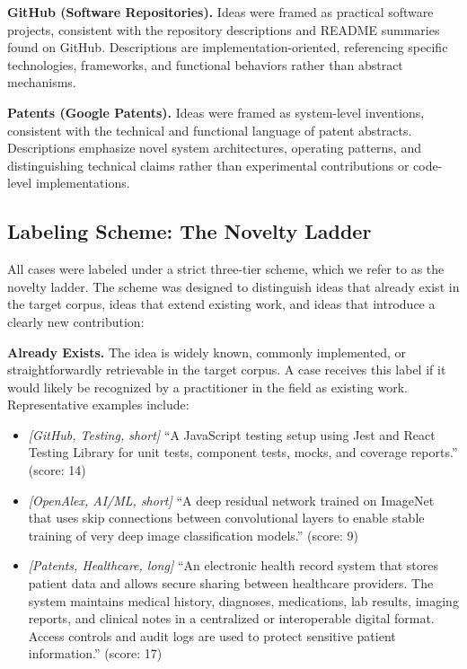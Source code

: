 \textbf{GitHub (Software Repositories).} Ideas were framed as practical software projects, consistent with the repository descriptions and README summaries found on GitHub. Descriptions are implementation-oriented, referencing specific technologies, frameworks, and functional behaviors rather than abstract mechanisms.
 
\textbf{Patents (Google Patents).} Ideas were framed as system-level inventions, consistent with the technical and functional language of patent abstracts. Descriptions emphasize novel system architectures, operating patterns, and distinguishing technical claims rather than experimental contributions or code-level implementations.
 
\subsection{Labeling Scheme: The Novelty Ladder}
 
All cases were labeled under a strict three-tier scheme, which we refer to as the novelty ladder. The scheme was designed to distinguish ideas that already exist in the target corpus, ideas that extend existing work, and ideas that introduce a clearly new contribution:
 
\textbf{Already Exists.} The idea is widely known, commonly implemented, or straightforwardly retrievable in the target corpus. A case receives this label if it would likely be recognized by a practitioner in the field as existing work. Representative examples include:
 
\begin{itemize}
    \item \textit{[GitHub, Testing, short]} ``A JavaScript testing setup using Jest and React Testing Library for unit tests, component tests, mocks, and coverage reports.'' (score: 14)
    \item \textit{[OpenAlex, AI/ML, short]} ``A deep residual network trained on ImageNet that uses skip connections between convolutional layers to enable stable training of very deep image classification models.'' (score: 9)
    \item \textit{[Patents, Healthcare, long]} ``An electronic health record system that stores patient data and allows secure sharing between healthcare providers. The system maintains medical history, diagnoses, medications, lab results, imaging reports, and clinical notes in a centralized or interoperable digital format. Access controls and audit logs are used to protect sensitive patient information.'' (score: 17)
\end{itemize}
 
